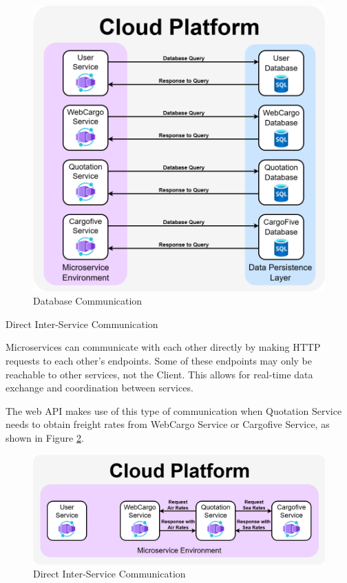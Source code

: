\documentclass[12pt,reqno, oneside]{amsbook}
\makeatletter
\def\subsection{\@startsection{subsection}{2}%
      \z@{.5\linespacing\@plus.7\linespacing}{.25\linespacing}%
      {\normalfont\bfseries\flushleft}}
\theoremstyle{definition}
\theoremstyle{definition}
\numberwithin{section}{chapter}
\numberwithin{table}{chapter}
\numberwithin{figure}{chapter}
\makeatother
\begin{document}
\begin{figure}[H]
  \centering
  \includegraphics[width=0.9\linewidth]{images/DatabaseCommunication.png}
  \caption{\label{Figure:DatabaseCommunication}Database Communication}
\end{figure}

\pagebreak

\subsection{Direct Inter-Service Communication}

Microservices can communicate with each other directly by making \ac{HTTP} requests to each other's endpoints. Some of these endpoints may only be reachable to other services, not the Client. This allows for real-time data exchange and coordination between services.

The web \ac{API} makes use of this type of communication when Quotation Service needs to obtain freight rates from WebCargo Service or Cargofive Service, as shown in Figure \ref{Figure:DirectCommunication}.

\begin{figure}[H]
  \centering
  \includegraphics[width=1\linewidth]{images/DirectCommunication.png}
  \caption{\label{Figure:DirectCommunication}Direct Inter-Service Communication}
\end{figure}
\end{document}
